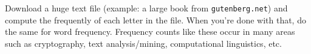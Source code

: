 Download a huge text file (example: a large book from \verb!gutenberg.net!)
and compute the frequently of each letter in the file.
When you're done with that, do the same for word frequency.
Frequency counts like these occur in many areas such as
cryptography, text analysis/mining, computational linguistics, etc.
